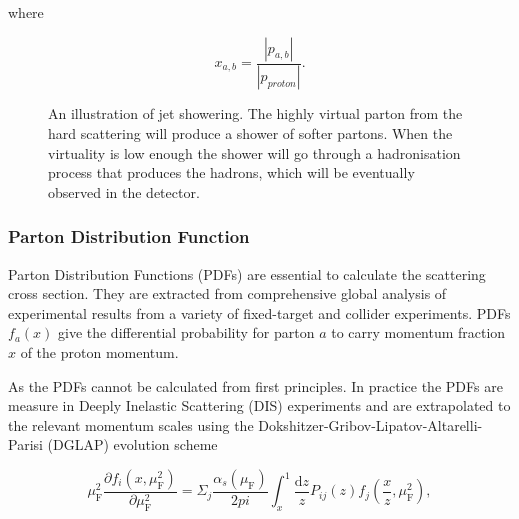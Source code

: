 \noindent where 

$$x_{a,b} = \frac{\left| p_{a,b} \right|}{\left| p_{proton} \right|}.$$

%

\begin{figure}
\centering

\caption[Jet showering]{An illustration of jet showering. The highly virtual parton from the hard scattering will produce a shower of softer partons. When the virtuality is low enough the shower will go through a hadronisation process that produces the hadrons, which will be eventually observed in the detector. }
\label{fig:showering}
\end{figure}



\subsubsection*{Parton Distribution Function}
Parton Distribution Functions (PDFs) are essential to calculate the scattering cross section. They are extracted from comprehensive global analysis of experimental results from a variety of fixed-target and collider experiments. PDFs $f_a\left(x\right)$ give the differential probability for parton $a$ to carry momentum fraction $x$ of the proton momentum. 

As the PDFs cannot be calculated from first principles. In practice the PDFs are measure in Deeply Inelastic Scattering (DIS) experiments and are extrapolated to the relevant momentum scales using the Dokshitzer-Gribov-Lipatov-Altarelli-Parisi (DGLAP) evolution scheme ~\cite{Gribov:1972ri,Altarelli:1977zs,Dokshitzer:1977sg}  %

\begin{equation}
\mu_\mathrm{F}^2 \frac{\partial f_i\left(x,\mu_{\mathrm{F}}^2 \right)}{\partial \mu_{\mathrm{F}}^2} = \Sigma_j \frac{\alpha_s\left(\mu_{\mathrm{F}}\right)}{2{pi}} \int _x^1 \frac{\mathrm{d}z}{z} P_{ij}(z) f_j\left(\frac{x}{z},\mu_{\mathrm{F}}^2\right),
\label{eq:dglap}
\end{equation}


